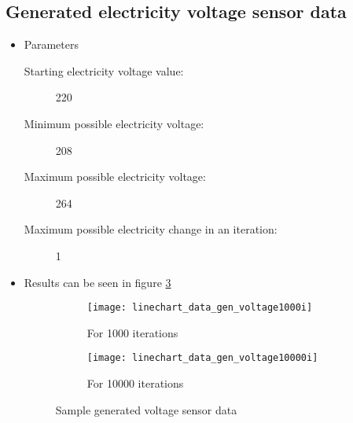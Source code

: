                 \subsection{Generated electricity voltage sensor data}
                        \begin{itemize}
                            \item Parameters
                                \begin{description}
                                    \item[Starting electricity voltage value:] 220
                                    \item[Minimum possible electricity voltage:] 208
                                    \item[Maximum possible electricity voltage:] 264
                                    \item[Maximum possible electricity change in an iteration:] 1
                                \end{description}
                            \item Results can be seen in figure \ref{fig:gen_voltage}
                                \begin{figure}
                                    \centering
                                    \captionsetup{type=figure}
                                    \begin{subfigure}[b]{0.45\textwidth}
                                        \centering
                                        \texttt{[image: linechart\_data\_gen\_voltage1000i]}
                                        \caption{For 1000 iterations}
                                        \label{chart:gen_voltage_1000}
                                    \end{subfigure}
                                    \hfill
                                    \begin{subfigure}[b]{0.45\textwidth}
                                        \centering
                                        \texttt{[image: linechart\_data\_gen\_voltage10000i]}
                                        \caption{For 10000 iterations}
                                        \label{chart:gen_voltage_10000}
                                    \end{subfigure}
                                    
                                    \caption{Sample generated voltage sensor data }
                                    \label{fig:gen_voltage}
                            \end{figure}
                        \end{itemize}


